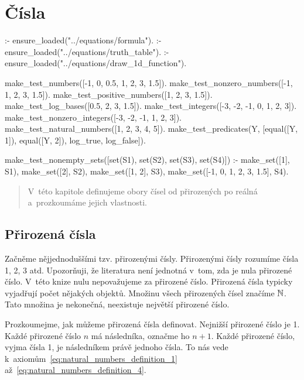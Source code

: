 \chapter{Čísla}

\begin{prolog}
:- ensure_loaded("../equations/formula").
:- ensure_loaded("../equations/truth_table").
:- ensure_loaded("../equations/draw_1d_function").

make_test_numbers([-1, 0, 0.5, 1, 2, 3, 1.5]).
make_test_nonzero_numbers([-1, 1, 2, 3, 1.5]).
make_test_positive_numbers([1, 2, 3, 1.5]).
make_test_log_bases([0.5, 2, 3, 1.5]).
make_test_integers([-3, -2, -1, 0, 1, 2, 3]).
make_test_nonzero_integers([-3, -2, -1, 1, 2, 3]).
make_test_natural_numbers([1, 2, 3, 4, 5]).
make_test_predicates(Y, [equal([Y, 1]), equal([Y, 2]), log_true, log_false]).

make_test_nonempty_sets([set(S1), set(S2), set(S3), set(S4)]) :-
	make_set([1], S1),
	make_set([2], S2),
	make_set([1, 2], S3),
	make_set([-1, 0, 1, 2, 3, 1.5], S4).
	
\end{prolog}


\begin{abstract}
V~této kapitole definujeme obory čísel od přirozených po reálná a~prozkoumáme jejich vlastnosti.
\end{abstract}

\section{Přirozená čísla}

Začněme nějjednoduššími tzv. přirozenými čísly. Přirozenými čísly rozumíme čísla 1, 2, 3 atd. Upozorňuji, že literatura není jednotná v~tom, zda je nula přirozené číslo. V~této knize nulu nepovažujeme za přirozené číslo. Přirozená čísla typicky vyjadřují počet nějakých objektů. Množinu všech přirozených čísel značíme \(\mathbb{N}\). Tato množina je nekonečná, neexistuje největší přirozené číslo.

Prozkoumejme, jak můžeme přirozená čísla definovat. Nejnižší přirozené číslo je 1. Každé přirozené číslo \(n\) má
následníka, označme ho \(n + 1\). Každé přirozené číslo, vyjma čísla 1, je následníkem právě jednoho čísla. To nás vede k~axiomům~\eqref{eq:natural_numbers_definition_1} až~\eqref{eq:natural_numbers_definition_4}.

